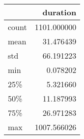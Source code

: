 \begin{tabular}{lr}
\toprule
{} &     duration \\
\midrule
count &  1101.000000 \\
mean  &    31.476439 \\
std   &    66.191223 \\
min   &     0.078202 \\
25\%   &     5.321660 \\
50\%   &    11.187993 \\
75\%   &    26.971283 \\
max   &  1007.566026 \\
\bottomrule
\end{tabular}
